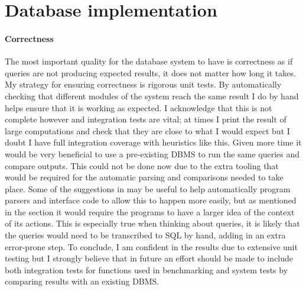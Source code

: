 \section{Database implementation} %
\paragraph{Correctness} The most important quality for the database system to
have is correctness as if queries are not producing expected results, it does
not matter how long it takes. My strategy for ensuring correctness is rigorous
unit tests. By automatically checking that different modules of the system reach
the same result I do by hand helps ensure that it is working as expected. I
acknowledge that this is not complete however and integration tests are vital;
at times I print the result of large computations and check that they are close
to what I would expect but I doubt I have full integration coverage with
heuristics like this. Given more time it would be very beneficial to use a
pre-existing DBMS to run the same queries and compare outputs. This could not be
done now due to the extra tooling that would be required for the automatic
parsing and comparisons needed to take place. Some of the suggestions in
 may be useful to help automatically
program parsers and interface code to allow this to happen more easily, but as
mentioned in the section it would require the programs to have a larger idea of
the context of its actions. This is especially true when thinking about
queries, it is likely that the queries would need to be transcribed to SQL by
hand, adding in an extra error-prone step. To conclude, I am confident in the
results due to extensive unit testing but I strongly believe that in future an
effort should be made to include both integration tests for functions used in
benchmarking and system tests by comparing results with an existing DBMS.

